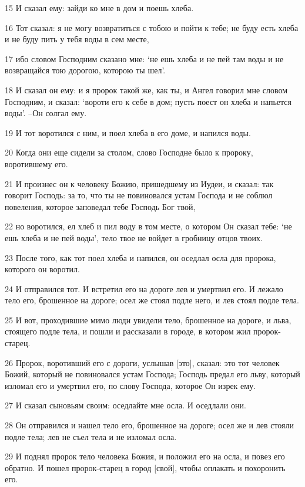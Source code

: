 \par 15 И сказал ему: зайди ко мне в дом и поешь хлеба.
\par 16 Тот сказал: я не могу возвратиться с тобою и пойти к тебе; не буду есть хлеба и не буду пить у тебя воды в сем месте,
\par 17 ибо словом Господним сказано мне: `не ешь хлеба и не пей там воды и не возвращайся тою дорогою, которою ты шел'.
\par 18 И сказал он ему: и я пророк такой же, как ты, и Ангел говорил мне словом Господним, и сказал: `вороти его к себе в дом; пусть поест он хлеба и напьется воды'. --Он солгал ему.
\par 19 И тот воротился с ним, и поел хлеба в его доме, и напился воды.
\par 20 Когда они еще сидели за столом, слово Господне было к пророку, воротившему его.
\par 21 И произнес он к человеку Божию, пришедшему из Иудеи, и сказал: так говорит Господь: за то, что ты не повиновался устам Господа и не соблюл повеления, которое заповедал тебе Господь Бог твой,
\par 22 но воротился, ел хлеб и пил воду в том месте, о котором Он сказал тебе: `не ешь хлеба и не пей воды', тело твое не войдет в гробницу отцов твоих.
\par 23 После того, как тот поел хлеба и напился, он оседлал осла для пророка, которого он воротил.
\par 24 И отправился тот. И встретил его на дороге лев и умертвил его. И лежало тело его, брошенное на дороге; осел же стоял подле него, и лев стоял подле тела.
\par 25 И вот, проходившие мимо люди увидели тело, брошенное на дороге, и льва, стоящего подле тела, и пошли и рассказали в городе, в котором жил пророк-старец.
\par 26 Пророк, воротивший его с дороги, услышав [это], сказал: это тот человек Божий, который не повиновался устам Господа; Господь предал его льву, который изломал его и умертвил его, по слову Господа, которое Он изрек ему.
\par 27 И сказал сыновьям своим: оседлайте мне осла. И оседлали они.
\par 28 Он отправился и нашел тело его, брошенное на дороге; осел же и лев стояли подле тела; лев не съел тела и не изломал осла.
\par 29 И поднял пророк тело человека Божия, и положил его на осла, и повез его обратно. И пошел пророк-старец в город [свой], чтобы оплакать и похоронить его.

